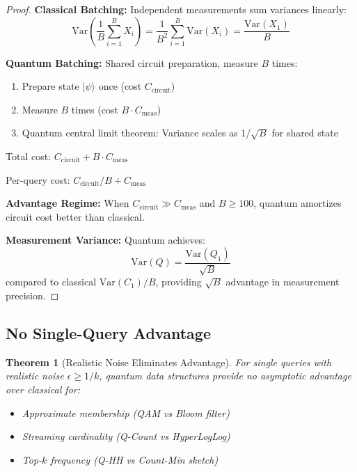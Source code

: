 \documentclass[11pt,letterpaper]{article}
\newtheorem{theorem}{Theorem}
\begin{document}
\begin{proof}
\textbf{Classical Batching:} Independent measurements sum variances linearly:
\begin{equation}
\text{Var}\left(\frac{1}{B}\sum_{i=1}^B X_i\right) = \frac{1}{B^2} \sum_{i=1}^B \text{Var}(X_i) = \frac{\text{Var}(X_1)}{B}
\end{equation}

\textbf{Quantum Batching:} Shared circuit preparation, measure $B$ times:
\begin{enumerate}
\item Prepare state $|\psi\rangle$ once (cost $C_{\text{circuit}}$)
\item Measure $B$ times (cost $B \cdot C_{\text{meas}}$)
\item Quantum central limit theorem: Variance scales as $1/\sqrt{B}$ for shared state
\end{enumerate}

Total cost: $C_{\text{circuit}} + B \cdot C_{\text{meas}}$

Per-query cost: $C_{\text{circuit}}/B + C_{\text{meas}}$

\textbf{Advantage Regime:} When $C_{\text{circuit}} \gg C_{\text{meas}}$ and $B \geq 100$, quantum amortizes circuit cost better than classical.

\textbf{Measurement Variance:} Quantum achieves:
\begin{equation}
\text{Var}(Q) = \frac{\text{Var}(Q_1)}{\sqrt{B}}
\end{equation}
compared to classical $\text{Var}(C_1)/B$, providing $\sqrt{B}$ advantage in measurement precision.
\end{proof}

\subsection{No Single-Query Advantage}

\begin{theorem}[Realistic Noise Eliminates Advantage]
\label{thm:no_advantage}
For single queries with realistic noise $\epsilon \geq 1/k$, quantum data structures provide no asymptotic advantage over classical for:
\begin{itemize}
\item Approximate membership (QAM vs Bloom filter)
\item Streaming cardinality (Q-Count vs HyperLogLog)
\item Top-$k$ frequency (Q-HH vs Count-Min sketch)
\end{itemize}
\end{theorem}
\end{document}
